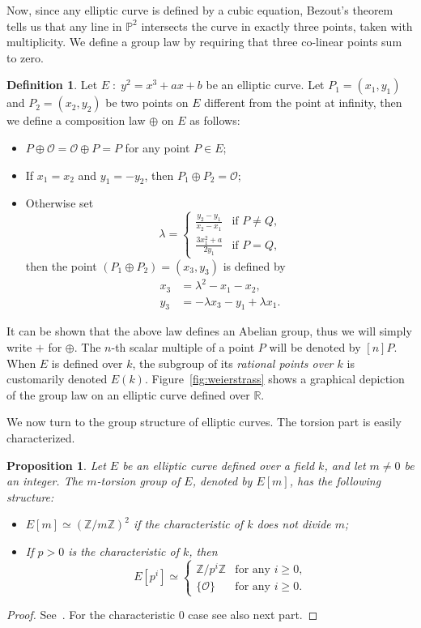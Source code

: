 \documentclass[10pt]{article}
\theoremstyle{plain}
\newtheorem{proposition}[theorem]{Proposition}
\theoremstyle{definition}
\newtheorem{definition}[theorem]{Definition}
\def\P{\ensuremath{\mathbb{P}}}
\def\O{\ensuremath{\mathcal{O}}}
\begin{document}
Now, since any elliptic curve is defined by a cubic equation, Bezout's
theorem tells us that any line in $\P^2$ intersects the curve in
exactly three points, taken with multiplicity. %
We define a group law by requiring that three co-linear points sum to
zero. %

\begin{definition}
  Let $E\;:\;y^2=x^3+ax+b$ be an elliptic curve. Let $P_1=(x_1,y_1)$
  and $P_2=(x_2,y_2)$ be two points on $E$ different from the point at
  infinity, then we define a composition law $⊕$ on $E$ as
  follows:
  \begin{itemize}
  \item $P ⊕ \O = \O ⊕ P = P$ for any point $P∈E$;
  \item If $x_1=x_2$ and $y_1=-y_2$, then $P_1⊕P_2 = \O$;
  \item Otherwise set
    \[λ =
      \begin{cases}
        \frac{y_2-y_1}{x_2-x_1} &\text{if $P≠Q$,}\\
        \frac{3x_1^2+a}{2y_1} &\text{if $P=Q$,}
      \end{cases}
    \]
    then the point $(P_1⊕P_2)=(x_3,y_3)$ is defined by
    \begin{align*}
      x_3 &= λ^2 - x_1 - x_2,\\
      y_3 &= -λx_3 - y_1 + λx_1.
    \end{align*}
  \end{itemize}
\end{definition}

It can be shown that the above law defines an Abelian group, thus we
will simply write $+$ for $⊕$. %
The $n$-th scalar multiple of a point $P$ will be denoted by $[n]P$. %
When $E$ is defined over $k$, the subgroup of its \emph{rational
  points over $k$} is customarily denoted $E(k)$. %
Figure~\ref{fig:weierstrass} shows a graphical depiction of the group
law on an elliptic curve defined over $ℝ$.

We now turn to the group structure of elliptic curves. %
The torsion part is easily characterized.

\begin{proposition}
  Let $E$ be an elliptic curve defined over a field $k$, and let $m≠0$
  be an integer. %
  The $m$-torsion group of $E$, denoted by $E[m]$, has the following
  structure:
  \begin{itemize}
  \item $E[m] ≃ (ℤ/mℤ)^2$ if the characteristic of $k$ does not divide
    $m$;
  \item If $p>0$ is the characteristic of $k$, then 
    \[E[p^i] ≃
      \begin{cases}
        ℤ/p^iℤ & \text{for any $i≥0$,}\\
        \{\O\} & \text{for any $i≥0$.}
      \end{cases}
    \]
  \end{itemize}
\end{proposition}
\begin{proof}
  See~\cite[Coro.~6.4]{silverman:elliptic}. For the characteristic $0$
  case see also next part.
\end{proof}
\end{document}
